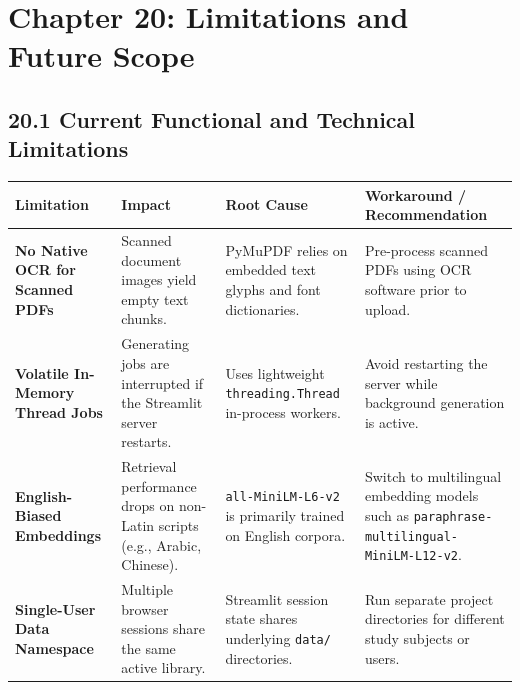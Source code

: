 \documentclass[
]{article}
\begin{document}
\section{Chapter 20: Limitations and Future
Scope}\label{chapter-20-limitations-and-future-scope}

\subsection{20.1 Current Functional and Technical
Limitations}\label{current-functional-and-technical-limitations}

\begingroup\footnotesize
\begin{longtable}[]{@{}
  >{\raggedright\arraybackslash\sloppy}p{}
  >{\raggedright\arraybackslash\sloppy}p{}
  >{\raggedright\arraybackslash\sloppy}p{}
  >{\raggedright\arraybackslash\sloppy}p{}@{}}
\toprule\noalign{}
\begin{minipage}[b]{\linewidth}\raggedright
Limitation
\end{minipage} & \begin{minipage}[b]{\linewidth}\raggedright
Impact
\end{minipage} & \begin{minipage}[b]{\linewidth}\raggedright
Root Cause
\end{minipage} & \begin{minipage}[b]{\linewidth}\raggedright
Workaround / Recommendation
\end{minipage} \\
\midrule\noalign{}
\endhead
\bottomrule\noalign{}
\endlastfoot
\textbf{No Native OCR for Scanned PDFs} & Scanned document images yield
empty text chunks. & PyMuPDF relies on embedded text glyphs and font
dictionaries. & Pre-process scanned PDFs using OCR software prior to
upload. \\
\textbf{Volatile In-Memory Thread Jobs} & Generating jobs are
interrupted if the Streamlit server restarts. & Uses lightweight
\texttt{threading.\allowbreak Thread} in-process workers. & Avoid restarting the
server while background generation is active. \\
\textbf{English-Biased Embeddings} & Retrieval performance drops on
non-Latin scripts (e.g., Arabic, Chinese). & \texttt{all-MiniLM-L6-v2}
is primarily trained on English corpora. & Switch to multilingual
embedding models such as
\texttt{paraphrase-multilingual-MiniLM-L12-v2}. \\
\textbf{Single-User Data Namespace} & Multiple browser sessions share
the same active library. & Streamlit session state shares underlying
\texttt{data/\allowbreak } directories. & Run separate project directories for
different study subjects or users. \\
\end{longtable}
\endgroup
\end{document}

